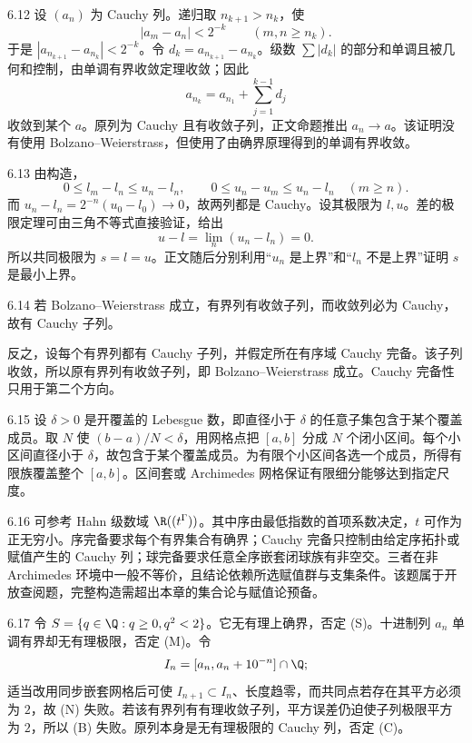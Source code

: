 \begin{solution}{6.12}
设 \((a_n)\) 为 Cauchy 列。递归取 \(n_{k+1}>n_k\)，使
\[
 |a_m-a_n|<2^{-k}\qquad(m,n\ge n_k).
\]
于是 \(|a_{n_{k+1}}-a_{n_k}|<2^{-k}\)。令 \(d_k=a_{n_{k+1}}-a_{n_k}\)。级数 \(\sum|d_k|\) 的部分和单调且被几何和控制，由单调有界收敛定理收敛；因此
\[
 a_{n_k}=a_{n_1}+\sum_{j=1}^{k-1}d_j
\]
收敛到某个 \(a\)。原列为 Cauchy 且有收敛子列，正文命题推出 \(a_n\to a\)。该证明没有使用 Bolzano--Weierstrass，但使用了由确界原理得到的单调有界收敛。
\end{solution}

\begin{solution}{6.13}
由构造，
\[
 0\le l_m-l_n\le u_n-l_n,\qquad
 0\le u_n-u_m\le u_n-l_n\quad(m\ge n).
\]
而 \(u_n-l_n=2^{-n}(u_0-l_0)\to0\)，故两列都是 Cauchy。设其极限为 \(l,u\)。差的极限定理可由三角不等式直接验证，给出
\[
 u-l=\lim_n(u_n-l_n)=0.
\]
所以共同极限为 \(s=l=u\)。正文随后分别利用“\(u_n\) 是上界”和“\(l_n\) 不是上界”证明 \(s\) 是最小上界。
\end{solution}

\begin{solution}{6.14}
若 Bolzano--Weierstrass 成立，有界列有收敛子列，而收敛列必为 Cauchy，故有 Cauchy 子列。

反之，设每个有界列都有 Cauchy 子列，并假定所在有序域 Cauchy 完备。该子列收敛，所以原有界列有收敛子列，即 Bolzano--Weierstrass 成立。Cauchy 完备性只用于第二个方向。
\end{solution}

\begin{solution}{6.15}
设 \(\delta>0\) 是开覆盖的 Lebesgue 数，即直径小于 \(\delta\) 的任意子集包含于某个覆盖成员。取 \(N\) 使 \((b-a)/N<\delta\)，用网格点把 \([a,b]\) 分成 \(N\) 个闭小区间。每个小区间直径小于 \(\delta\)，故包含于某个覆盖成员。为有限个小区间各选一个成员，所得有限族覆盖整个 \([a,b]\)。区间套或 Archimedes 网格保证有限细分能够达到指定尺度。
\end{solution}

\begin{solution}{6.16}
可参考 Hahn 级数域 \(\R((t^\Gamma))\)。其中序由最低指数的首项系数决定，\(t\) 可作为正无穷小。序完备要求每个有界集合有确界；Cauchy 完备只控制由给定序拓扑或赋值产生的 Cauchy 列；球完备要求任意全序嵌套闭球族有非空交。三者在非 Archimedes 环境中一般不等价，且结论依赖所选赋值群与支集条件。该题属于开放查阅题，完整构造需超出本章的集合论与赋值论预备。
\end{solution}

\begin{solution}{6.17}
令 \(S=\{q\in\Q:q\ge0,q^2<2\}\)。它无有理上确界，否定 (S)。十进制列 \(a_n\) 单调有界却无有理极限，否定 (M)。令
\[
 I_n=[a_n,a_n+10^{-n}]\cap\Q;
\]
适当改用同步嵌套网格后可使 \(I_{n+1}\subset I_n\)、长度趋零，而共同点若存在其平方必须为 \(2\)，故 (N) 失败。若该有界列有有理收敛子列，平方误差仍迫使子列极限平方为 \(2\)，所以 (B) 失败。原列本身是无有理极限的 Cauchy 列，否定 (C)。
\end{solution}


